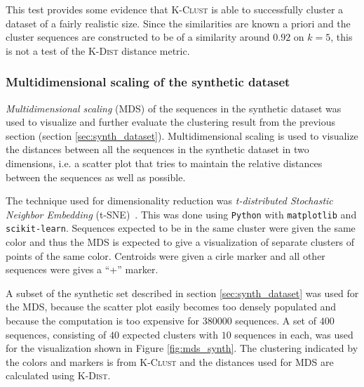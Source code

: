 This test provides some evidence that \textsc{K-Clust} is able to successfully
cluster a dataset of a fairly realistic size. Since the similarities are known
a priori and the cluster sequences are constructed to be of a similarity around
$0.92$ on $k=5$, this is not a test of the \textsc{K-Dist} distance metric.


\subsubsection{Multidimensional scaling of the synthetic dataset}
\label{sec:mds_synth}

\emph{Multidimensional scaling} (MDS) of the sequences in the synthetic dataset
was used to visualize and further evaluate the clustering result from the
previous section (section \ref{sec:synth_dataset}). Multidimensional scaling is
used to visualize the distances between all the sequences in the synthetic
dataset in two dimensions, i.e. a scatter plot that tries to maintain the
relative distances between the sequences as well as possible.

The technique used for dimensionality reduction was \emph{t-distributed
Stochastic Neighbor Embedding} (t-SNE)~\cite{maaten}. This was done using
\texttt{Python} with \texttt{matplotlib} and \texttt{scikit-learn}. Sequences
expected to be in the same cluster were given the same color and thus the MDS
is expected to give a visualization of separate clusters of points of the same
color. Centroids were given a cirle marker and all other sequences were gives a
``+'' marker.

A subset of the synthetic set described in section \ref{sec:synth_dataset} was
used for the MDS, because the scatter plot easily becomes too densely
populated and because the computation is too expensive for \num{380000}
sequences. A set of $400$ sequences, consisting of $40$ expected clusters with
$10$ sequences in each, was used for the visualization shown in Figure
\ref{fig:mds_synth}. The clustering indicated by the colors and markers is
from \textsc{K-Clust} and the distances used for MDS are calculated using
\textsc{K-Dist}.

